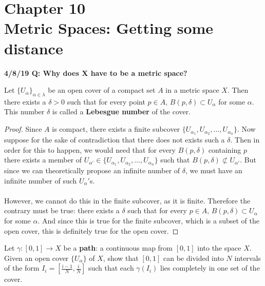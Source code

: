\documentclass[a4paper,12pt,twoside]{hmcpset}
\begin{document}
\section*{Chapter 10\\ Metric Spaces: Getting some distance}

\noindent
\textbf{4/8/19 Q: Why does X have to be a metric space?}\\
\begin{problem} 
    Let $\{U_{\alpha}\}_{\alpha \in \lambda}$ be an open cover of a
    compact set $A$ in a metric space $X$. Then there exists a
    $\delta > 0$ such that for every point $p \in A$, $B(p, \delta)
    \subset U_\alpha$ for some $\alpha$. This number $\delta$ is called a \textbf{Lebesgue
    number} of the cover.
\end{problem}

\begin{proof} 
    Since $A$ is compact, there exists a finite subcover
    $\{U_{\alpha_1}, U_{\alpha_2}, \dots, U_{\alpha_n}\}$.
    Now suppose for the sake of contradiction that there does not exists
    such a  $\delta$.
    Then in order for this to happen, we would need
    that for every $B(p, \delta)$ containing $p$ there exists a member
    of $U_{\alpha'} \in \{U_{\alpha_1}, U_{\alpha_2}, \dots,
    U_{\alpha_n}\}$ such that 
    $B(p, \delta) \not\subset U_{\alpha'}$. But since we can
    theoretically propose an infinite number of $\delta$, we must have
    an infinite number of such $U_\alpha'$s. 
    \\
    \\
    However, we cannot do
    this in the finite subcover, as it is finite. Therefore the
    contrary must be true: there exists a $\delta$ such that for every
    $p \in A$, $B(p, \delta) \subset U_\alpha$ for some $\alpha$. And
    since this is true for the finite subcover, which is a subset of
    the open cover, this is definitely true for the open cover.

\end{proof}


\begin{problem}[Theorem 10.25]
    Let $\gamma : [0, 1] \to X$ be a \textbf{path}: a continuous map
    from $[0, 1]$ into the space $X$. Given an open cover
    $\{U_\alpha\}$ of $X$, show that $[0, 1]$ can be divided into $N$
    intervals of the form $I_i = [\frac{i - 1}{N}, \frac{i}{N}]$ 
    such that
    each $\gamma(I_i)$ lies completely in one set of the cover.    
\end{problem}
\end{document}
